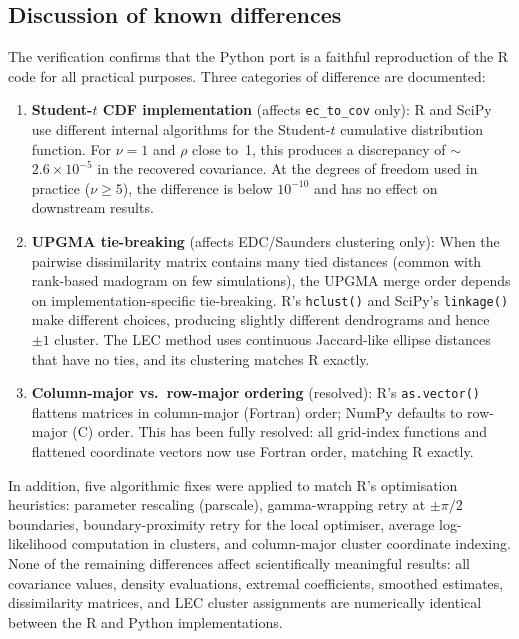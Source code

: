 \documentclass[a4paper]{elsarticle}
\begin{document}
\subsection{Discussion of known differences}

The verification confirms that the Python port is a faithful reproduction
of the R code for all practical purposes.
Three categories of difference are documented:

\begin{enumerate}
\item \textbf{Student-$t$ CDF implementation} (affects
  \texttt{ec\_to\_cov} only):
  R and SciPy use different internal algorithms for the Student-$t$
  cumulative distribution function.
  For $\nu = 1$ and $\rho$ close to~1, this produces a discrepancy
  of $\sim$$2.6 \times 10^{-5}$ in the recovered covariance.
  At the degrees of freedom used in practice ($\nu \geq 5$), the
  difference is below $10^{-10}$ and has no effect on downstream
  results.

\item \textbf{UPGMA tie-breaking} (affects EDC/Saunders clustering only):
  When the pairwise dissimilarity matrix contains many tied distances
  (common with rank-based madogram on few simulations), the
  UPGMA merge order depends on implementation-specific tie-breaking.
  R's \texttt{hclust()} and SciPy's \texttt{linkage()} make
  different choices, producing slightly different dendrograms
  and hence $\pm 1$ cluster.
  The LEC method uses continuous Jaccard-like ellipse distances
  that have no ties, and its clustering matches R exactly.

\item \textbf{Column-major vs.\ row-major ordering} (resolved):
  R's \texttt{as.vector()} flattens matrices in column-major (Fortran)
  order; NumPy defaults to row-major (C) order.
  This has been fully resolved: all grid-index functions and
  flattened coordinate vectors now use Fortran order,
  matching R exactly.
\end{enumerate}

In addition, five algorithmic fixes were applied to match R's
optimisation heuristics:
parameter rescaling (parscale),
gamma-wrapping retry at $\pm\pi/2$ boundaries,
boundary-proximity retry for the local optimiser,
average log-likelihood computation in clusters,
and column-major cluster coordinate indexing.
None of the remaining differences affect scientifically meaningful
results: all covariance values, density evaluations, extremal
coefficients, smoothed estimates, dissimilarity matrices, and LEC
cluster assignments are numerically identical between the R and
Python implementations.
\end{document}
